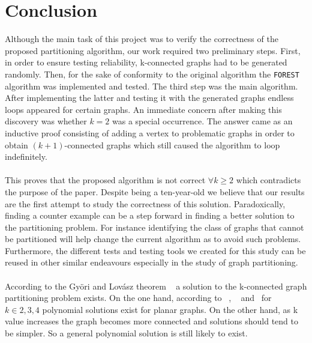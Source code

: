 \section{Conclusion}

Although the main task of this project was to verify the correctness of the proposed partitioning algorithm, our work required two preliminary steps. First, in order to ensure testing reliability, k-connected graphs had to be generated randomly. Then, for the sake of conformity to the original algorithm the \verb!FOREST! algorithm was implemented and tested. The third step was the main algorithm. After implementing the latter and testing it with the generated graphs endless loops appeared for certain graphs. An immediate concern after making this discovery was whether $k=2$ was a special occurrence. The answer came as an inductive proof consisting of adding a vertex to problematic graphs in order to obtain $(k+1)$-connected graphs which still caused the algorithm to loop indefinitely. 

\paragraph{}

This proves that the proposed algorithm is not correct $\forall k \geq 2$ which contradicts the purpose of the paper. Despite being a ten-year-old we believe that our results are the first attempt to study the correctness of this solution. Paradoxically, finding a counter example can be a step forward in finding a better solution to the partitioning problem. For instance identifying the class of graphs that cannot be partitioned will help change the current algorithm as to avoid such problems. Furthermore, the different tests and testing tools we created for this study can be reused in other similar endeavours especially in the study of graph partitioning.

\paragraph{}

According to the Györi and Lovász theorem ~\cite{GE78} a solution to the k-connected graph partitioning problem exists. On the one hand, according to ~\cite{JS94}, ~\cite{GE78,LL77} and ~\cite{Nakano1997315}for $k \in {2, 3, 4}$ polynomial solutions exist for planar graphs. On the other hand, as k value increases the graph becomes more connected and solutions should tend to be simpler. So a general polynomial solution is still likely to exist. 

